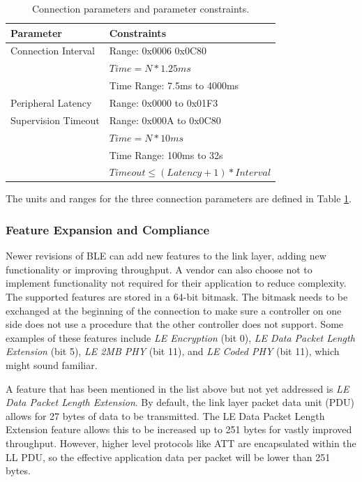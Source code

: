 \begin{table}
    \begin{center}
    \begin{tabular}{|l|l|}
        \hline
        \textbf{Parameter} & \textbf{Constraints} \\
        \hline
        Connection Interval & Range: 0x0006 0x0C80 \\
                            & $Time = N * 1.25ms$ \\
                            & Time Range: 7.5ms to 4000ms \\
        \hline
        Peripheral Latency  & Range: 0x0000 to 0x01F3 \\
        \hline
        Supervision Timeout & Range: 0x000A to 0x0C80 \\
                            & $Time = N * 10ms$ \\
                            & Time Range: 100ms to 32s \\
                            & $Timeout \leq (Latency + 1) * Interval$ \\
        \hline
    \end{tabular}
    \end{center}
    \caption{Connection parameters and parameter constraints.}
    \label{tbl:conn_params}
\end{table}

The units and ranges for the three connection parameters are defined in Table \ref{tbl:conn_params}.

\subsubsection{Feature Expansion and Compliance}
Newer revisions of BLE can add new features to the link layer, adding new functionality or improving throughput. A vendor can also choose not to implement functionality not required for their application to reduce complexity. The supported features are stored in a 64-bit bitmask. The bitmask needs to be exchanged at the beginning of the connection to make sure a controller on one side does not use a procedure that the other controller does not support. Some examples of these features include \textit{LE Encryption} (bit 0), \textit{LE Data Packet Length Extension} (bit 5), \textit{LE 2MB PHY} (bit 11), and \textit{LE Coded PHY} (bit 11), which might sound familiar\cite[p. 2827]{bluetooth_spec}.

A feature that has been mentioned in the list above but not yet addressed is \textit{LE Data Packet Length Extension}. By default, the link layer packet data unit (PDU) allows for 27 bytes of data to be transmitted. The LE Data Packet Length Extension feature allows this to be increased up to 251 bytes for vastly improved throughput. However, higher level protocols like ATT are encapsulated within the LL PDU, so the effective application data per packet will be lower than 251 bytes.

